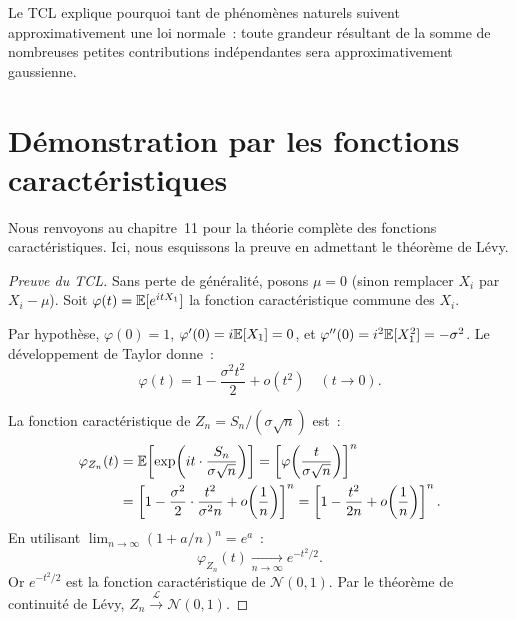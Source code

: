 \begin{intuition}[title=\textbf{Pourquoi la loi normale est-elle omnipresente~?}]
Le TCL explique pourquoi tant de ph\'enom\`enes naturels suivent approximativement
une loi normale~: toute grandeur r\'esultant de la somme de nombreuses petites
contributions ind\'ependantes sera approximativement gaussienne.
\end{intuition}

\section{D\'emonstration par les fonctions caract\'eristiques}

Nous renvoyons au chapitre~11 pour la th\'eorie compl\`ete des fonctions
caract\'eristiques. Ici, nous esquissons la preuve en admettant le th\'eor\`eme
de L\'evy.

\begin{proof}[Preuve du TCL]
Sans perte de g\'en\'eralit\'e, posons $\mu = 0$ (sinon remplacer $X_i$ par
$X_i - \mu$). Soit $\varphi(t) = \mathbb{E}[e^{itX_1}]$ la fonction caract\'eristique
commune des $X_i$.

Par hypoth\`ese, $\varphi(0) = 1$, $\varphi'(0) = i\mathbb{E}[X_1] = 0$, et
$\varphi''(0) = i^2\mathbb{E}[X_1^2] = -\sigma^2$. Le d\'eveloppement de Taylor donne~:
\[
    \varphi(t) = 1 - \frac{\sigma^2 t^2}{2} + o(t^2) \quad (t \to 0).
\]

La fonction caract\'eristique de $Z_n = S_n/(\sigma\sqrt{n})$ est~:
\begin{align*}
    \varphi_{Z_n}(t) &= \mathbb{E}\!\left[\exp\!\left(it \cdot \frac{S_n}{\sigma\sqrt{n}}\right)\right]
    = \left[\varphi\!\left(\frac{t}{\sigma\sqrt{n}}\right)\right]^n \\
    &= \left[1 - \frac{\sigma^2}{2}\cdot\frac{t^2}{\sigma^2 n}
       + o\!\left(\frac{1}{n}\right)\right]^n
    = \left[1 - \frac{t^2}{2n} + o\!\left(\frac{1}{n}\right)\right]^n.
\end{align*}
En utilisant $\lim_{n \to \infty}(1 + a/n)^n = e^a$~:
\[
    \varphi_{Z_n}(t) \xrightarrow[n \to \infty]{} e^{-t^2/2}.
\]
Or $e^{-t^2/2}$ est la fonction caract\'eristique de $\mathcal{N}(0,1)$.
Par le th\'eor\`eme de continuit\'e de L\'evy, $Z_n \xrightarrow{\mathcal{L}}
\mathcal{N}(0,1)$.
\end{proof}

